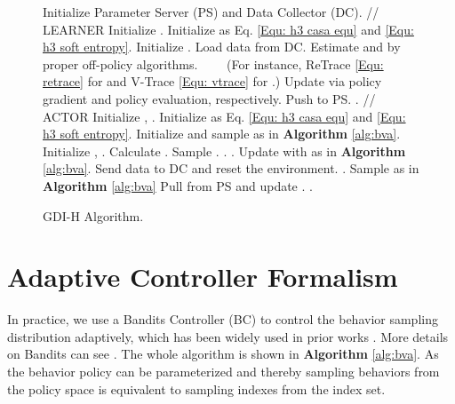\documentclass[nohyperref]{article}
\theoremstyle{plain}
\begin{document}
\begin{figure}[ht]
  \centering
  \begin{minipage}{.7\linewidth}
    \begin{algorithm}[H]
      \caption{GDI-H Algorithm.}  
          \begin{algorithmic}
            \STATE Initialize Parameter Server (PS) and Data Collector (DC).
            \STATE
            \STATE // LEARNER
            \STATE Initialize .
            \STATE Initialize   as Eq. \eqref{Equ: h3 casa equ} and \eqref{Equ: h3 soft entropy}.
            \STATE Initialize .
            \WHILE{}
                \STATE Load data from DC.
                \STATE Estimate  and  by proper off-policy algorithms.
                \STATE \ \ \ \ (For instance, ReTrace \eqref{Equ: retrace} for  and V-Trace \eqref{Equ: vtrace} for .)
                \STATE Update  via policy gradient and policy evaluation, respectively.
                    \STATE Push  to PS.
                \ENDIF
                \STATE .
            \ENDWHILE
            \STATE
            \STATE // ACTOR
            \STATE Initialize , .
            \STATE Initialize  as Eq. \eqref{Equ: h3 casa equ} and \eqref{Equ: h3 soft entropy}.
            \STATE Initialize  and sample  as in \textbf{Algorithm} \ref{alg:bva}.
            \STATE Initialize , .
            \WHILE{}
                \STATE Calculate .
                \STATE Sample .
                \STATE .
                \STATE .
                \IF{}
                    \STATE Update  with  as in \textbf{Algorithm} \ref{alg:bva}.
                    \STATE Send data to DC and reset the environment.
                    \STATE .
                    \STATE Sample  as in \textbf{Algorithm} \ref{alg:bva}
                \ENDIF
                    \STATE Pull  from PS and update .
                \ENDIF
                \STATE .
            \ENDWHILE
          \end{algorithmic}
        \label{alg:h3}
    \end{algorithm}
  \end{minipage}
\end{figure}

\clearpage

\section{Adaptive Controller Formalism}
\label{Sec: appendix MAB}

In practice, we use a Bandits Controller (BC) to control the behavior sampling distribution adaptively, which has been widely used in prior works \citep{agent57,casa_entropy}. More details on Bandits  can see \citep{sutton}. The whole algorithm is shown in \textbf{Algorithm} \ref{alg:bva}. As the behavior policy can be parameterized and thereby sampling behaviors from the policy space is equivalent to sampling indexes  from the index set. 
\end{document}
